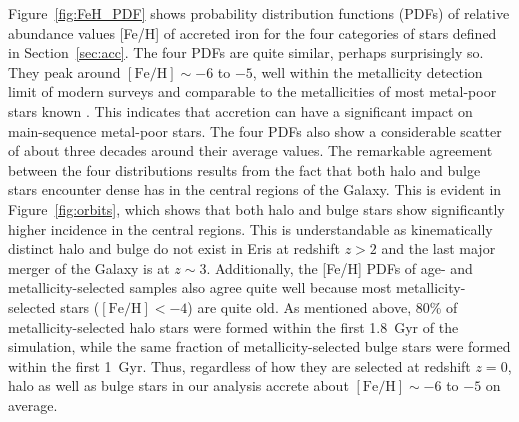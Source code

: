 \documentclass[a4paper,fleqn,usenatbib]{mnras}
\begin{document}
Figure~\ref{fig:FeH_PDF} shows probability distribution functions
(PDFs) of relative abundance values [Fe/H] of accreted iron for the
four categories of stars defined in Section~\ref{sec:acc}.  The four
PDFs are quite similar, perhaps surprisingly so.  They peak around
$[\mathrm{Fe}/\mathrm{H}] \sim -6$ to $-5$, well within the
metallicity detection limit of modern surveys
\citep{2013pss5.book...55F} and comparable to the metallicities of
most metal-poor stars known \citep{2011Natur.477...67C,
  2014Natur.506..463K}.  This indicates that accretion can have a
significant impact on main-sequence metal-poor stars.  The four PDFs
also show a considerable scatter of about three decades around their
average values.  The remarkable agreement between the four
distributions results from the fact that both halo and bulge stars
encounter dense has in the central regions of the Galaxy.  This is
evident in Figure~\ref{fig:orbits}, which shows that both halo and
bulge stars show significantly higher incidence in the central
regions.  This is understandable as kinematically distinct halo and
bulge do not exist in Eris at redshift $z>2$ and the last major merger
of the Galaxy is at $z\sim 3$.  Additionally, the [Fe/H] PDFs of age-
and metallicity-selected samples also agree quite well because most
metallicity-selected stars ($[\mathrm{Fe}/\mathrm{H}]< -4$) are quite
old.  As mentioned above, 80\% of metallicity-selected halo stars were
formed within the first 1.8~Gyr of the simulation, while the same
fraction of metallicity-selected bulge stars were formed within the
first 1~Gyr.  Thus, regardless of how they are selected at redshift
$z=0$, halo as well as bulge stars in our analysis accrete about
$[\mathrm{Fe}/\mathrm{H}] \sim -6$ to $-5$ on average.
\end{document}
